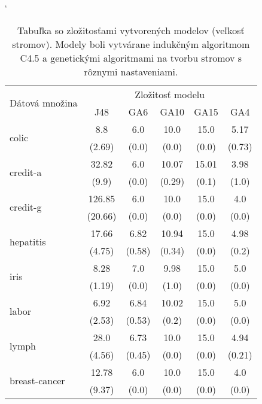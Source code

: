 \begin{table}[t]
\catcode`
\centering 
\newcommand\T{\rule{0pt}{2.6ex}}       %
\newcommand\B{\rule[-1.2ex]{0pt}{0pt}} %
\begin{tabular}{|l||c|c|c|c|c||}
\hline \multirow{2}{*}{Dátová množina} & \multicolumn{5}{c||}{Zložitosť modelu} \\ 
\cline{2-6} & J48 & GA6 & GA10 & GA15 & GA4 \\
\hline
\hline \multirow{2}{*}{colic} & 8.8 & 6.0 & 10.0 & 15.0 & 5.17 \T\\[-1.5ex]
& \tiny (2.69) & \tiny (0.0) & \tiny (0.0) & \tiny (0.0) & \tiny (0.73)\B\\
\hline \multirow{2}{*}{credit-a} & 32.82 & 6.0 & 10.07 & 15.01 & 3.98 \T\\[-1.5ex]
& \tiny (9.9) & \tiny (0.0) & \tiny (0.29) & \tiny (0.1) & \tiny (1.0)\B\\
\hline \multirow{2}{*}{credit-g} & 126.85 & 6.0 & 10.0 & 15.0 & 4.0\T\\[-1.5ex]
& \tiny (20.66) & \tiny (0.0) & \tiny (0.0) & \tiny (0.0) & \tiny (0.0)\B\\
\hline \multirow{2}{*}{hepatitis} & 17.66 & 6.82 & 10.94 & 15.0 & 4.98 \T\\[-1.5ex]
& \tiny (4.75) & \tiny (0.58) & \tiny (0.34) & \tiny (0.0) & \tiny (0.2)\B\\
\hline \multirow{2}{*}{iris} & 8.28 & 7.0 & 9.98 & 15.0 & 5.0 \T\\[-1.5ex]
& \tiny (1.19) & \tiny (0.0) & \tiny (1.0) & \tiny (0.0) & \tiny (0.0)\B\\
\hline \multirow{2}{*}{labor} & 6.92 & 6.84 & 10.02 & 15.0 & 5.0 \T\\[-1.5ex]
& \tiny (2.53) & \tiny (0.53) & \tiny (0.2) & \tiny (0.0) & \tiny (0.0)\B\\
\hline \multirow{2}{*}{lymph} & 28.0 & 6.73 & 10.0 & 15.0 & 4.94 \T\\[-1.5ex]
& \tiny (4.56) & \tiny (0.45) & \tiny (0.0) & \tiny (0.0) & \tiny (0.21)\B\\
\hline \multirow{2}{*}{breast-cancer} & 12.78 & 6.0 & 10.0 & 15.0 & 4.0 \T\\[-1.5ex]
& \tiny (9.37) & \tiny (0.0) & \tiny (0.0) & \tiny (0.0) & \tiny (0.0)\B\\
\hline
\end{tabular}
\caption{Tabuľka so zložitosťami vytvorených modelov (veľkosť stromov). Modely boli vytvárane indukčným algoritmom C4.5 a genetickými algoritmami na tvorbu stromov s rôznymi nastaveniami.}\label{fig:size}
\end{table}

